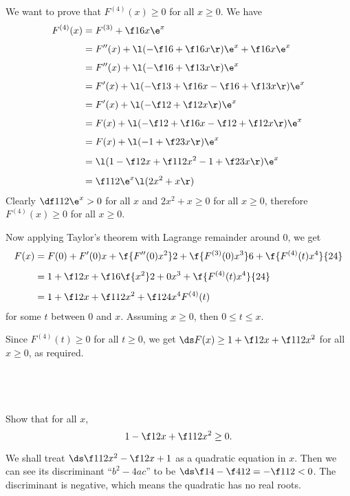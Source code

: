 \documentclass[a4paper]{article}
\begin{document}
We want to prove that $F^{(4)}(x) \ge 0$ for all $x \ge 0$. We have \begin{align*}
F^{(4)}(x) &= F^{(3)} + \f16 x \e^x\\[1ex]
&= F''(x) + \l( - \f16 + \f16 x \r) \e^x + \f16 x \e^x\\[1ex]
&= F''(x) + \l( - \f16 + \f13 x \r) \e^x\\[1ex]
&= F'(x) + \l( - \f13 + \f16 x - \f16 + \f13 x \r) \e^x\\[1ex]
&= F'(x) + \l( - \f12 + \f12 x \r) \e^x\\[1ex]
&= F(x) + \l( - \f12 + \f16 x - \f12 + \f12 x \r) \e^x\\[1ex]
&= F(x) + \l( - 1 + \f23 x \r) \e^x\\[1ex]
&= \l( 1 - \f12 x + \f1{12} x^2 - 1 + \f23 x \r) \e^x\\[1ex]
&= \f1{12} \e^x \l( 2 x^2 + x \r)
\end{align*}
Clearly $\df1{12} \e^x > 0$ for all $x$ and $2 x^2 + x \ge 0$ for all $x \ge 0$, therefore $F^{(4)}(x) \ge 0$ for all $x \ge 0$.

Now applying Taylor's theorem with Lagrange remainder around 0, we get \begin{align*}
F(x) &= F(0) + F'(0) x + \f{F''(0) x^2}2 + \f{F^{(3)}(0) x^3}6 + \f{F^{(4)}(t) x^4}{24}\\[1ex]
&= 1 + \f12 x + \f16 \f{x^2}2 + 0 x^3 + \f{F^{(4)}(t) x^4}{24}\\[1ex]
&= 1 + \f12 x + \f1{12} x^2 + \f1{24} x^4 F^{(4)}(t)
\end{align*}
for some $t$ between $0$ and $x$. Assuming $x \ge 0$, then $0 \le t \le x$.

Since $F^{(4)}(t) \ge 0$ for all $t \ge 0$, we get $\ds F(x) \ge 1 + \f12 x + \f1{12} x^2$ for all $x \ge 0$, as required.

\subsection{~} %

\begin{questionbody}
Show that for all $x$, \[
1 - \f12 x + \f1{12} x^2 \ge 0.
\]
\end{questionbody}

We shall treat $\ds \f1{12} x^2 - \f12 x + 1$ as a quadratic equation in $x$. Then we can see its discriminant \enquote{$b^2 - 4ac$} to be $\ds \f14 - \f4{12} = -\f1{12} < 0$. The discriminant is negative, which means the quadratic has no real roots.
\end{document}
